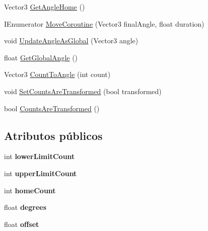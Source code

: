 \begin{DoxyCompactItemize}
Vector3 \mbox{\hyperlink{class_articulation_ac933fade16023f1adb224eed98427cb9}{Get\+Angle\+Home}} ()
\item 
I\+Enumerator \mbox{\hyperlink{class_articulation_a161b3c95046618f615f0b5d6867ef658}{Move\+Coroutine}} (Vector3 final\+Angle, float duration)
\item 
void \mbox{\hyperlink{class_articulation_a94f0c8fac481b23ec71ac8c4cd8b0862}{Update\+Angle\+As\+Global}} (Vector3 angle)
\item 
float \mbox{\hyperlink{class_articulation_ac60e77664f8666756cde14a3947a8306}{Get\+Global\+Angle}} ()
\item 
Vector3 \mbox{\hyperlink{class_articulation_a8b735ad392d0329c76f91e95768c026d}{Count\+To\+Angle}} (int count)
\item 
void \mbox{\hyperlink{class_articulation_ae1b9d736b24392a46c7d53e91cbe7908}{Set\+Counts\+Are\+Transformed}} (bool transformed)
\item 
bool \mbox{\hyperlink{class_articulation_aad8aba05576db394129968fe191ccc7c}{Counts\+Are\+Transformed}} ()
\end{DoxyCompactItemize}
\subsection*{Atributos públicos}
\begin{DoxyCompactItemize}
\item 
\mbox{\label{class_articulation_ab6f41ba4973672807b535fac03c03a18}} 
int {\bfseries lower\+Limit\+Count}
\item 
\mbox{\label{class_articulation_a0ce352a643712286ef497bbea705ca4d}} 
int {\bfseries upper\+Limit\+Count}
\item 
\mbox{\label{class_articulation_aa91625a05579d28909f96473cbd02744}} 
int {\bfseries home\+Count}
\item 
\mbox{\label{class_articulation_ae611787f027dbde080c7530fa68d1eee}} 
float {\bfseries degrees}
\item 
\mbox{\label{class_articulation_a14c25a5ae970e12d63af0224be518556}} 
float {\bfseries offset}
\end{DoxyCompactItemize}
